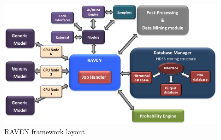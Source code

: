 \begin{figure}[ht]
  \centering
  \includegraphics[width=1.0\textwidth]  {pics/RavenFramework.png}
  \caption{RAVEN framework layout}
  \label{fig:RAVENframeworkLayout}
\end{figure}

